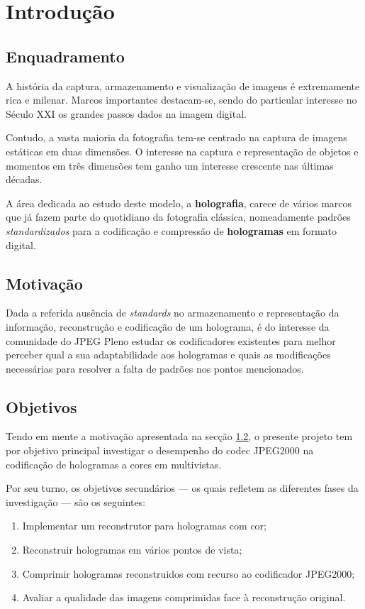 \chapter{Introdução}
\label{ch::intro}


\section{Enquadramento}
\label{sec::intro:enquad}


A história da captura, armazenamento e visualização de imagens é extremamente rica e milenar. Marcos importantes destacam-se, sendo do particular interesse no Século XXI os grandes passos dados na imagem digital.

Contudo, a vasta maioria da fotografia tem-se centrado na captura de imagens estáticas em duas dimensões. O interesse na captura e representação de objetos e momentos em três dimensões tem ganho um interesse crescente nas últimas décadas.

A área dedicada ao estudo deste modelo, a \textbf{holografia}, carece de vários marcos que já fazem parte do quotidiano da fotografia clássica, nomeadamente padrões \textit{standardizados} para a codificação e compressão de \textbf{hologramas} em formato digital.


\section{Motivação}
\label{sec::intro:motiv}
Dada a referida ausência de \textit{standards} no armazenamento e representação da informação, reconstrução e codificação de um holograma, é do interesse da comunidade do JPEG Pleno estudar os codificadores existentes para melhor perceber qual a sua adaptabilidade aos hologramas e quais as modificações necessárias para resolver a falta de padrões nos pontos mencionados.


\section{Objetivos}
\label{sec::intro:objs}
Tendo em mente a motivação apresentada na secção \ref{sec::intro:motiv}, o presente projeto tem por objetivo principal investigar o desempenho do codec JPEG2000 na codificação de hologramas a cores em multivistas.

Por seu turno, os objetivos secundários --- os quais refletem as diferentes fases da investigação --- são os seguintes:

\begin{enumerate}
  \item \label{obj:implementar_reconstrutor} Implementar um reconstrutor para hologramas com cor;
  \item \label{obj:reconstruir_vistas} Reconstruir hologramas em vários pontos de vista;
  \item \label{obj:comprimir} Comprimir hologramas reconstruidos com recurso ao codificador JPEG2000;
  \item \label{obj:avaliar_psnr} Avaliar a qualidade das imagens comprimidas face à reconstrução original.
\end{enumerate}

